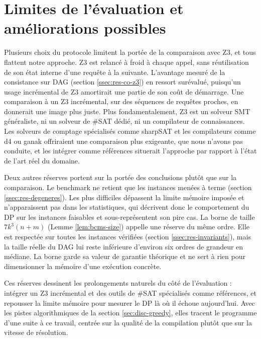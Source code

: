 \documentclass[11pt,a4paper]{report}
\theoremstyle{plain}
\theoremstyle{definition}
\begin{document}
\section{Limites de l'évaluation et améliorations possibles}
\label{sec:disc-limites}

Plusieurs choix du protocole limitent la portée de la comparaison
avec Z3, et tous flattent notre approche. Z3 est relancé à froid à
chaque appel, sans réutilisation de son état interne d'une requête à
la suivante. L'avantage mesuré de la consistance sur DAG
(section \ref{ssec:res-co-z3}) en ressort surévalué, puisqu'un usage
incrémental de Z3 amortirait une partie de son coût de démarrage. Une
comparaison à un Z3 incrémental, sur des séquences de requêtes
proches, en donnerait une image plus juste. Plus fondamentalement, Z3
est un solveur SMT généraliste, ni un solveur de \#SAT dédié, ni un
compilateur de connaissances. Les solveurs de comptage spécialisés
comme sharpSAT \cite{thurley2006} et les compilateurs comme
d4 \cite{lagniez2017} ou ganak offriraient une comparaison plus
exigeante, que nous n'avons pas conduite, et les intégrer comme
références situerait l'approche par rapport à l'état de l'art réel du
domaine.

Deux autres réserves portent sur la portée des conclusions plutôt que
sur la comparaison. Le benchmark ne retient que les instances menées à
terme (section \ref{ssec:res-degeneres}). Les plus difficiles
dépassent la limite mémoire imposée et n'apparaissent pas dans les
statistiques, qui décrivent donc le comportement du DP sur les
instances faisables et sous-représentent son pire cas. La borne de
taille $7 k^3 (n + m)$ (Lemme \ref{lem:bcms-size}) appelle une
réserve du même ordre. Elle est respectée sur toutes les instances
vérifiées (section \ref{ssec:res-invariants}), mais la taille réelle
du DAG lui reste inférieure d'environ six ordres de grandeur en
médiane. La borne garde sa valeur de garantie théorique et ne sert à
rien pour dimensionner la mémoire d'une exécution concrète.

Ces réserves dessinent les prolongements naturels du côté de
l'évaluation : intégrer un Z3 incrémental et des outils de \#SAT
spécialisés comme références, et repousser la limite mémoire pour
mesurer le DP là où il échoue aujourd'hui. Avec les pistes
algorithmiques de la section \ref{sec:disc-greedy}, elles tracent le
programme d'une suite à ce travail, centrée sur la qualité de la
compilation plutôt que sur la vitesse de résolution.
\end{document}
